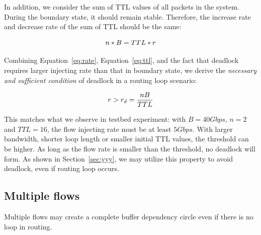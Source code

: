 In addition, we consider the sum of TTL values of all packets in the system. 
During the boundary state, it should remain stable. Therefore, the increase
rate and decrease rate of the sum of TTL should be the same:

\begin{equation}
\small
n * B = TTL * r
\label{eq:ttl}
\end{equation}

Combining Equation~\ref{eq:rate}, Equation~\ref{eq:ttl}, and the fact that
deadlock requires larger injecting rate than that in boundary state, we derive the 
{\em necessary and sufficient condition} of deadlock in a routing loop scenario:

\begin{equation}
\small
r > r_d = \frac{nB}{TTL}
\label{eq:condition}
\end{equation}

This matches what we observe in testbed experiment: with $B=40Gbps$, $n=2$ and
$TTL=16$, the flow injecting rate must be at least $5Gbps$. With larger bandwidth,
shorter loop length or smaller initial TTL values, the threshold can be higher.
As long as the flow rate is smaller than the threshold, no deadlock will form.
As shown in Section~\ref{sec:yyy}, we may utilize this property to avoid deadlock, 
even if routing loop occurs. 















\subsection{Multiple flows}

Multiple flows may create a complete buffer dependency circle even if there is no loop in routing.




